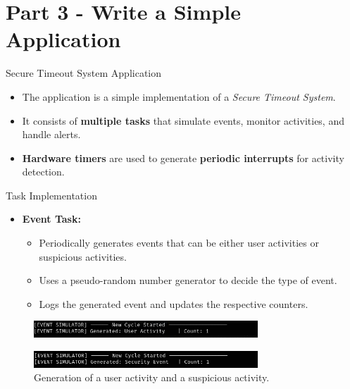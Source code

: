 
\section{Part 3 - Write a Simple Application}

\begin{frame}{Secure Timeout System Application}
    \begin{itemize}
        \item The application is a simple implementation of a \textit{Secure Timeout System}.
        \item It consists of \textbf{multiple tasks} that simulate events, monitor activities, and handle alerts.
        \item \textbf{Hardware timers} are used to generate \textbf{periodic interrupts} for activity detection.
    \end{itemize}
\end{frame}

\begin{frame}{Task Implementation}
    \begin{itemize}
        \item \textbf{Event Task:}
            \begin{itemize}
                \item Periodically generates events that can be either user activities or suspicious activities.
                \item Uses a pseudo-random number generator to decide the type of event.
                \item Logs the generated event and updates the respective counters.
            \end{itemize}
    \end{itemize}
    \begin{figure}[h]
        \centering
        \includegraphics[width=0.75\textwidth]{images/event_task_1.png}
    \end{figure}
    \begin{figure}[h]
        \centering
        \includegraphics[width=0.75\textwidth]{images/event_task_2.png}
        \caption{Generation of a user activity and a suspicious activity.}
    \end{figure}
\end{frame}


